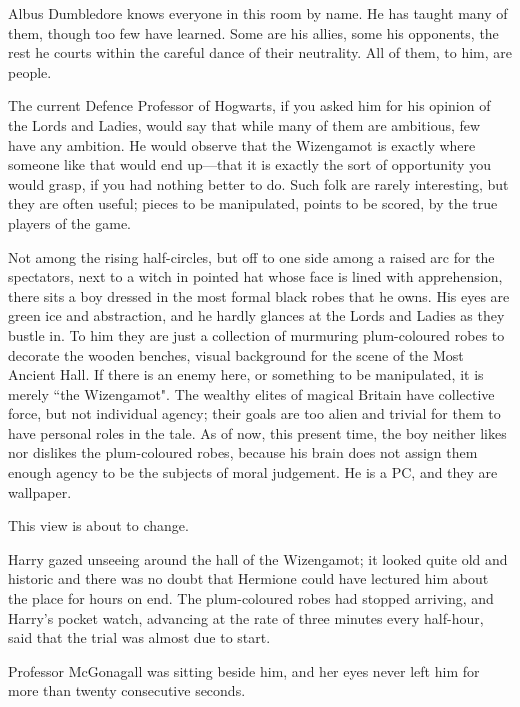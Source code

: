 Albus Dumbledore knows everyone in this room by name. He has taught many of them, though too few have learned. Some are his allies, some his opponents, the rest he courts within the careful dance of their neutrality. All of them, to him, are people.

The current Defence Professor of Hogwarts, if you asked him for his opinion of the Lords and Ladies, would say that while many of them are ambitious, few have any ambition. He would observe that the Wizengamot is exactly where someone like that would end up—that it is exactly the sort of opportunity you would grasp, if you had nothing better to do. Such folk are rarely interesting, but they are often useful; pieces to be manipulated, points to be scored, by the true players of the game.

Not among the rising half-circles, but off to one side among a raised arc for the spectators, next to a witch in pointed hat whose face is lined with apprehension, there sits a boy dressed in the most formal black robes that he owns. His eyes are green ice and abstraction, and he hardly glances at the Lords and Ladies as they bustle in. To him they are just a collection of murmuring plum-coloured robes to decorate the wooden benches, visual background for the scene of the Most Ancient Hall. If there is an enemy here, or something to be manipulated, it is merely ``the Wizengamot". The wealthy elites of magical Britain have collective force, but not individual agency; their goals are too alien and trivial for them to have personal roles in the tale. As of now, this present time, the boy neither likes nor dislikes the plum-coloured robes, because his brain does not assign them enough agency to be the subjects of moral judgement. He is a PC, and they are wallpaper.

This view is about to change.

\later

Harry gazed unseeing around the hall of the Wizengamot; it looked quite old and historic and there was no doubt that Hermione could have lectured him about the place for hours on end. The plum-coloured robes had stopped arriving, and Harry's pocket watch, advancing at the rate of three minutes every half-hour, said that the trial was almost due to start.

Professor McGonagall was sitting beside him, and her eyes never left him for more than twenty consecutive seconds.

